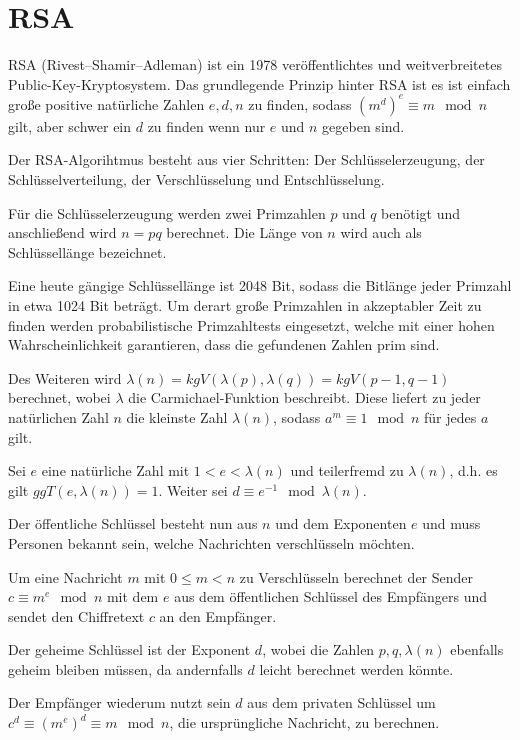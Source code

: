 \section{RSA}

RSA (Rivest–Shamir–Adleman) ist ein 1978 veröffentlichtes und weitverbreitetes Public-Key-Kryptosystem.
Das grundlegende Prinzip hinter RSA ist es ist einfach große positive natürliche Zahlen $e,d,n$ zu finden, sodass $(m^d)^e \equiv m \mod n$ gilt, aber schwer ein $d$ zu finden wenn nur $e$ und $n$ gegeben sind.

Der RSA-Algorihtmus besteht aus vier Schritten: Der Schlüsselerzeugung, der Schlüsselverteilung, der Verschlüsselung und Entschlüsselung.

Für die Schlüsselerzeugung werden zwei Primzahlen $p$ und $q$ benötigt und anschließend wird $n = pq$ berechnet. Die Länge von $n$ wird auch als Schlüssellänge bezeichnet.

Eine heute gängige Schlüssellänge ist 2048 Bit, sodass die Bitlänge jeder Primzahl in etwa 1024 Bit beträgt. 
Um derart große Primzahlen in akzeptabler Zeit zu finden werden probabilistische Primzahltests eingesetzt, welche mit einer hohen Wahrscheinlichkeit garantieren, dass die gefundenen Zahlen prim sind.

Des Weiteren wird $\lambda(n) = kgV(\lambda(p),\lambda(q)) = kgV(p-1, q-1)$ berechnet, wobei $\lambda$ die Carmichael-Funktion beschreibt.
Diese liefert zu jeder natürlichen Zahl $n$ die kleinste Zahl $\lambda(n)$, sodass $a^m \equiv 1 \mod n$ für jedes $a$ gilt.

Sei $e$ eine natürliche Zahl mit $1<e<\lambda(n)$ und teilerfremd zu $\lambda(n)$, d.h. es gilt $ggT(e,\lambda(n)) = 1$. Weiter sei $d \equiv e^{-1} \mod \lambda(n)$.

Der öffentliche Schlüssel besteht nun aus $n$ und dem Exponenten $e$ und muss Personen bekannt sein, welche Nachrichten verschlüsseln möchten.

Um eine Nachricht $m$ mit $0 \leq m < n$ zu Verschlüsseln berechnet der Sender $c \equiv m^e \mod n$ mit dem $e$ aus dem öffentlichen Schlüssel des Empfängers und sendet den Chiffretext $c$ an den Empfänger.

Der geheime Schlüssel ist der Exponent $d$, wobei die Zahlen $p,q,\lambda(n)$ ebenfalls geheim bleiben müssen, da andernfalls $d$ leicht berechnet werden könnte.

Der Empfänger wiederum nutzt sein $d$ aus dem privaten Schlüssel um $c^d \equiv (m^e)^d \equiv m \mod n$, die ursprüngliche Nachricht, zu berechnen.




